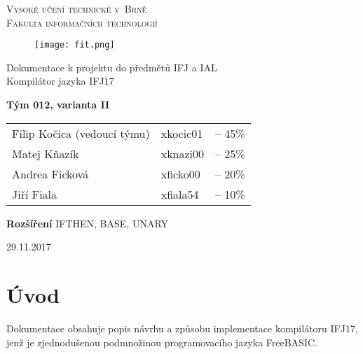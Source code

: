 \documentclass[11pt, titlepage, a4paper]{article}
\begin{document}
		\begin{titlepage}
		\begin{center}
		\textsc{\Huge{Vysoké učení technické v~Brně\\}
		\huge{Fakulta informačních technologií\\}}
		\begin{figure}[!h]
  			\centering
  			\texttt{[image: fit.png]}
		\end{figure}
		\Huge{Dokumentace k projektu do předmětů IFJ a IAL\\}
		\medskip
		\LARGE{Kompilátor jazyka IFJ17\\}
		\end{center}
		\Large{\textbf{Tým 012, varianta II}\\}
		\newline
		\begin{tabular}{lll}
		Filip Kočica (vedoucí týmu) & xkocic01 & -- 45\% \\
		Matej Kňazík & xknazi00 & -- 25\% \\
		Andrea Ficková & xficko00 & -- 20\% \\
		Jiří Fiala & xfiala54 & -- 10\% \\
		\end{tabular}
		\newline\newline
		\newline
		\textbf{Rozšíření} \newline IFTHEN, BASE, UNARY
		\begin{center}
		\Large{29.11.2017}
		\end{center}
		\end{titlepage}

		\tableofcontents

		\newpage
		\section{Úvod}

		\indent \indent Dokumentace obsahuje popis návrhu a způsobu implementace kompilátoru IFJ17, jenž je zjednodušenou podmnožinou programovacího 
		jazyka FreeBASIC.
\end{document}
